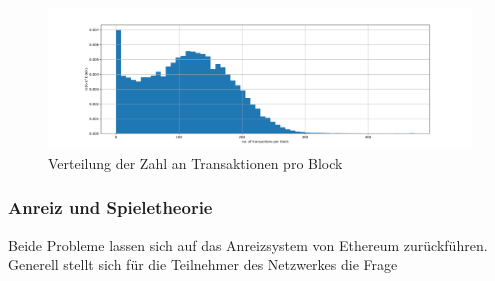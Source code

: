 \documentclass[runningheads]{llncs}
\begin{document}
\begin{figure}[h]
  \includegraphics[width=\textwidth, keepaspectratio]{blocks_transactions_per_block.png}
  \caption{Verteilung der Zahl an Transaktionen pro Block \cite{neemann_appendix_nodate}}
  \label{blocks_transactions_per_block}
\end{figure}

\subsubsection{Anreiz und Spieletheorie}
Beide Probleme lassen sich auf das Anreizsystem von Ethereum zurückführen. Generell stellt sich für die Teilnehmer des Netzwerkes die Frage
\end{document}
